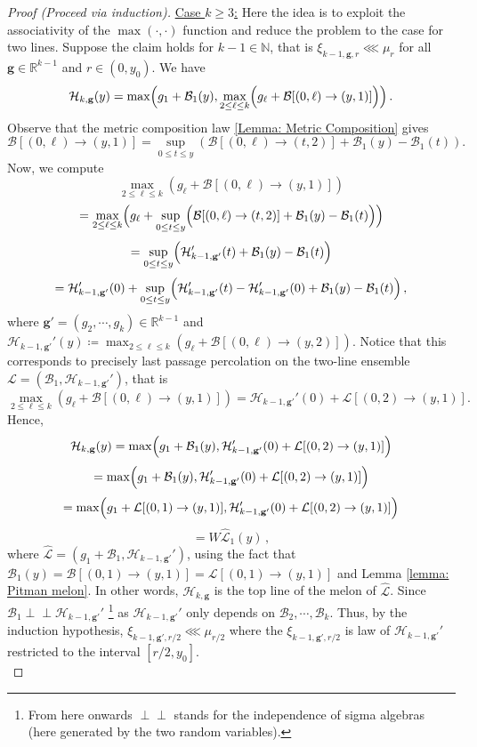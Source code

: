 \documentclass[12pt]{report}
\theoremstyle{plain}
\newcommand{\N}{\ensuremath{\mathbb{N}}}
\newcommand{\R}{\ensuremath{\mathbb{R}}}
\newcommand{\indep}{\perp \!\!\! \perp}
\begin{document}
\begin{proof}[Proof (Proceed via induction)]
\noindent\underline{Case $k\geq 3$:} Here the idea is to exploit the associativity of the $\max(\cdot,\cdot)$ function and reduce the problem to the case for two lines. Suppose the claim holds for $k-1\in\N$, that is $\xi_{k-1, \mathbf{g},r}\lll\mu_r$ for all $\mathbf{g}\in\R^{k-1}$ and $r\in(0,y_0)$. We have
\[
\mathcal{H}_{k,\mathbf{g}}(y) = \max\Bigl(g_1+\mathcal{B}_1(y), \displaystyle\max_{2\leq \ell\leq k}\Bigl(g_\ell+\mathbf{\mathcal{B}}[(0,\ell)\to(y,1)]\Bigr)\Bigr)\,.
\]
Observe that the metric composition law \ref{Lemma: Metric Composition} gives 
\[
\mathbf{\mathcal{B}}[(0,\ell)\to(y,1)] = \displaystyle\sup_{0\leq t\leq y}(\mathbf{\mathcal{B}}[(0,\ell)\to(t,2)]+\mathcal{B}_1(y)-\mathcal{B}_1(t)).
\]
Now, we compute
\[
\displaystyle\max_{2\leq \ell\leq k}(g_\ell+\mathbf{\mathcal{B}}[(0,\ell)\to(y,1)])
\]
\[
= \displaystyle\max_{2\leq \ell\leq k}\Bigl(g_\ell+\displaystyle\sup_{0\leq t\leq y}\Bigl(\mathbf{\mathcal{B}}[(0,\ell)\to(t,2)]+\mathcal{B}_1(y)-\mathcal{B}_1(t)\Bigr)\Bigr)
\]
\[
= \displaystyle\sup_{0\leq t\leq y}\Bigr(\mathcal{H}_{k-1,\mathbf{g}'}'(t)+\mathcal{B}_1(y)-\mathcal{B}_1(t)\Bigl)\]
\[
= \mathcal{H}_{k-1,\mathbf{g}'}'(0)+\displaystyle\sup_{0\leq t\leq y}\Bigr(\mathcal{H}_{k-1,\mathbf{g}'}'(t)-\mathcal{H}_{k-1,\mathbf{g}'}'(0)+\mathcal{B}_1(y)-\mathcal{B}_1(t)\Bigl)\,,
\]
where $\mathbf{g}' = (g_2,\cdots, g_k)\in\R^{k-1}$ and $\mathcal{H}_{k-1,\mathbf{g}'}'(y) \coloneqq \displaystyle\max_{2\leq \ell\leq k}(g_\ell+\mathbf{\mathcal{B}}[(0,\ell)\to(y,2)])$. Notice that this corresponds to precisely last passage percolation on the two-line ensemble $\mathcal{L} = (\mathcal{B}_1, \mathcal{H}_{k-1,\mathbf{g}'}')$, that is
\[
\displaystyle\max_{2\leq \ell\leq k}(g_\ell+\mathbf{\mathcal{B}}[(0,\ell)\to(y,1)]) = \mathcal{H}_{k-1,\mathbf{g}'}'(0) + \mathcal{L}[(0,2)\to(y,1)].
\]
Hence, 
\[
\mathcal{H}_{k,\mathbf{g}}(y) = \max\Bigl(g_1+\mathcal{B}_1(y), \mathcal{H}_{k-1,\mathbf{g}'}'(0) + \mathcal{L}[(0,2)\to(y,1)]\Bigr)
\]
\[
= \max\Bigl(g_1+\mathcal{B}_1(y), \mathcal{H}_{k-1,\mathbf{g}'}'(0) + \mathcal{L}[(0,2)\to(y,1)]\Bigr)
\]
\[
= \max\Bigl(g_1+\mathcal{L}[(0,1)\to(y,1)], \mathcal{H}_{k-1,\mathbf{g}'}'(0) + \mathcal{L}[(0,2)\to(y,1)]\Bigr)
\]
\[
= W\hat{\mathcal{L}}_1(y)\,,
\]
where $\hat{\mathcal{L}} = (g_1+\mathcal{B}_1, \mathcal{H}_{k-1,\mathbf{g}'}')$, using the fact that $\mathcal{B}_1(y) = \mathbf{\mathcal{B}}[(0,1)\to(y,1)] = \mathcal{L}[(0,1)\to(y,1)]$ and Lemma \ref{lemma: Pitman melon}. In other words, $\mathcal{H}_{k,\mathbf{g}}$ is the top line of the melon of $\hat{\mathcal{L}}$. Since $\mathcal{B}_1 \indep \mathcal{H}_{k-1,\mathbf{g}'}'$ \footnote{From here onwards $\indep$ stands for the independence of sigma algebras (here generated by the two random variables).} as $\mathcal{H}_{k-1,\mathbf{g}'}'$ only depends on $\mathcal{B}_2,\cdots, \mathcal{B}_k$. Thus, by the induction hypothesis, $\xi_{k-1, \mathbf{g}',r/2} \lll \mu_{r/2}$ where the $\xi_{k-1, \mathbf{g}',r/2}$ is law of $\mathcal{H}_{k-1,\mathbf{g}'}'$ restricted to the interval $[r/2, y_0]$.\\


\end{proof}
\end{document}
